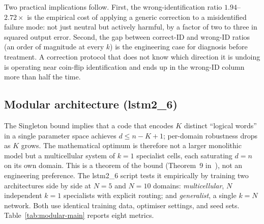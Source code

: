 \documentclass[11pt,a4paper]{article}
\begin{document}
Two practical implications follow. First, the wrong-identification ratio $1.94$--$2.72\times$ is the empirical cost of applying a generic correction to a misidentified failure mode: not just neutral but actively harmful, by a factor of two to three in squared output error. Second, the gap between correct-ID and wrong-ID ratios (an order of magnitude at every $k$) is the engineering case for diagnosis before treatment. A correction protocol that does not know which direction it is undoing is operating near coin-flip identification and ends up in the wrong-ID column more than half the time.


\subsection{Modular architecture (lstm2\_6)}
\label{sec:exp-modular}

The Singleton bound implies that a code that encodes $K$ distinct ``logical words'' in a single parameter space achieves $d \leq n - K + 1$; per-domain robustness drops as $K$ grows. The mathematical optimum is therefore not a larger monolithic model but a multicellular system of $k = 1$ specialist cells, each saturating $d = n$ on its own domain. This is a theorem of the bound (Theorem~9 in~\cite{SyndromeAlgebra}), not an engineering preference. The lstm2\_6 script tests it empirically by training two architectures side by side at $N = 5$ and $N = 10$ domains: \emph{multicellular}, $N$ independent $k = 1$ specialists with explicit routing; and \emph{generalist}, a single $k = N$ network. Both use identical training data, optimiser settings, and seed sets. Table~\ref{tab:modular-main} reports eight metrics.
\end{document}
